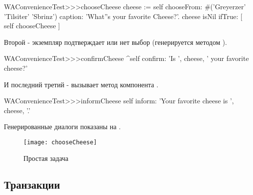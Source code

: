 \documentclass[a4paper,10pt,twoside]{book}
\begin{document}
\begin{code}{}
WAConvenienceTest>>>chooseCheese
	cheese := self
		chooseFrom: #('Greyerzer' 'Tilsiter' 'Sbrinz')
		caption: 'What''s your favorite Cheese?'.
	cheese isNil ifTrue: [ self chooseCheese ]
\end{code}



Второй - экземпляр  подтверждает или нет выбор
(генерируется методом ). 

\begin{code}{}
WAConvenienceTest>>>confirmCheese
	^self confirm: 'Is ', cheese,  ' your favorite cheese?'
\end{code}


И последний третий - вызывает метод 
компонента .

\begin{code}{}
WAConvenienceTest>>>informCheese
	self inform: 'Your favorite cheese is ', cheese, '.'
\end{code}


Генерированные диалоги показаны на .

\begin{figure}[ht]
\begin{center}
\texttt{[image: chooseCheese]}
\caption{Простая задача}
\end{center}
\end{figure}


\subsection{Транзакции}
\end{document}
